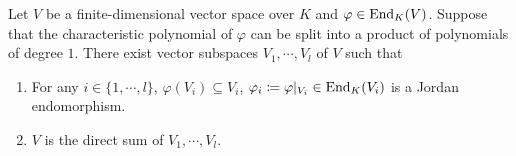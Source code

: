 \begin{theoremenv}
    Let $V$ be a finite-dimensional vector space over $K$ and $\varphi \in \operatorname{\mathrm{End}}_{K}(V)$.
    Suppose that the characteristic polynomial of $\varphi$ can be split into a product of polynomials of degree $1$.
    There exist vector subspaces $V_1,\cdots, V_l$ of $V$ such that
    \begin{enumerate}[label = (\arabic*)]
        \item For any $i \in \{1,\cdots,l\}$, $\varphi(V_i) \subseteq V_i$, $\varphi_i \coloneq \varphi|_{V_i} \in \operatorname{\mathrm{End}}_{K}(V_i)$ is a Jordan endomorphism.
        \item $V$ is the direct sum of $V_1,\cdots, V_l$.
    \end{enumerate}
\end{theoremenv}

